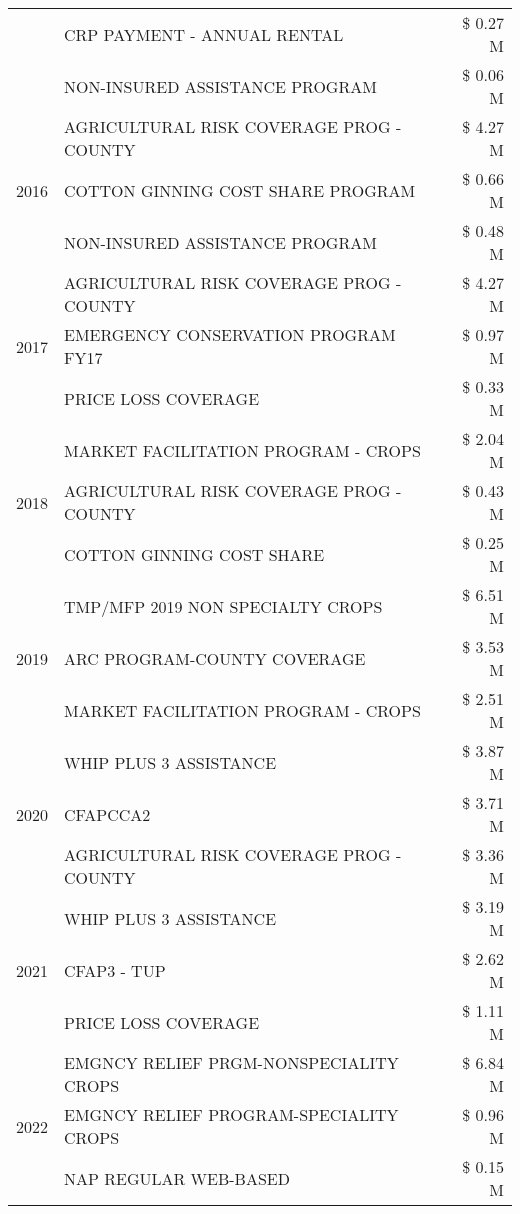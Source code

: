 \begin{tabular}{llr}
 & CRP PAYMENT - ANNUAL RENTAL & \$ 0.27 M \\
 & NON-INSURED ASSISTANCE PROGRAM & \$ 0.06 M \\
\cline{1-3}
\multirow[t]{3}{*}{2016} & AGRICULTURAL RISK COVERAGE PROG - COUNTY & \$ 4.27 M \\
 & COTTON GINNING COST SHARE PROGRAM & \$ 0.66 M \\
 & NON-INSURED ASSISTANCE PROGRAM & \$ 0.48 M \\
\cline{1-3}
\multirow[t]{3}{*}{2017} & AGRICULTURAL RISK COVERAGE PROG - COUNTY & \$ 4.27 M \\
 & EMERGENCY CONSERVATION PROGRAM FY17 & \$ 0.97 M \\
 & PRICE LOSS COVERAGE & \$ 0.33 M \\
\cline{1-3}
\multirow[t]{3}{*}{2018} & MARKET FACILITATION PROGRAM - CROPS & \$ 2.04 M \\
 & AGRICULTURAL RISK COVERAGE PROG - COUNTY & \$ 0.43 M \\
 & COTTON GINNING COST SHARE & \$ 0.25 M \\
\cline{1-3}
\multirow[t]{3}{*}{2019} & TMP/MFP 2019 NON SPECIALTY CROPS & \$ 6.51 M \\
 & ARC PROGRAM-COUNTY COVERAGE & \$ 3.53 M \\
 & MARKET FACILITATION PROGRAM - CROPS & \$ 2.51 M \\
\cline{1-3}
\multirow[t]{3}{*}{2020} & WHIP PLUS 3 ASSISTANCE & \$ 3.87 M \\
 & CFAPCCA2 & \$ 3.71 M \\
 & AGRICULTURAL RISK COVERAGE PROG - COUNTY & \$ 3.36 M \\
\cline{1-3}
\multirow[t]{3}{*}{2021} & WHIP PLUS 3 ASSISTANCE & \$ 3.19 M \\
 & CFAP3 - TUP & \$ 2.62 M \\
 & PRICE LOSS COVERAGE & \$ 1.11 M \\
\cline{1-3}
\multirow[t]{3}{*}{2022} & EMGNCY RELIEF PRGM-NONSPECIALITY CROPS & \$ 6.84 M \\
 & EMGNCY RELIEF PROGRAM-SPECIALITY CROPS & \$ 0.96 M \\
 & NAP REGULAR WEB-BASED & \$ 0.15 M \\
\cline{1-3}
\bottomrule
\end{tabular}
